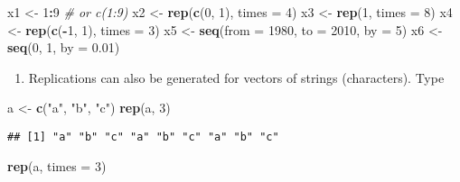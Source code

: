 \documentclass[]{article}
\newenvironment{Shaded}{\begin{snugshade}}{\end{snugshade}}
\newcommand{\KeywordTok}[1]{\textcolor[rgb]{0.13,0.29,0.53}{\textbf{#1}}}
\newcommand{\DataTypeTok}[1]{\textcolor[rgb]{0.13,0.29,0.53}{#1}}
\newcommand{\DecValTok}[1]{\textcolor[rgb]{0.00,0.00,0.81}{#1}}
\newcommand{\FloatTok}[1]{\textcolor[rgb]{0.00,0.00,0.81}{#1}}
\newcommand{\StringTok}[1]{\textcolor[rgb]{0.31,0.60,0.02}{#1}}
\newcommand{\CommentTok}[1]{\textcolor[rgb]{0.56,0.35,0.01}{\textit{#1}}}
\newcommand{\OperatorTok}[1]{\textcolor[rgb]{0.81,0.36,0.00}{\textbf{#1}}}
\newcommand{\NormalTok}[1]{#1}
\providecommand{\tightlist}{%
  \setlength{\itemsep}{0pt}\setlength{\parskip}{0pt}}
\begin{document}
\begin{Shaded}
\begin{Highlighting}[]
\NormalTok{x1 <-}\StringTok{ }\DecValTok{1}\OperatorTok{:}\DecValTok{9}  \CommentTok{# or c(1:9)}
\NormalTok{x2 <-}\StringTok{ }\KeywordTok{rep}\NormalTok{(}\KeywordTok{c}\NormalTok{(}\DecValTok{0}\NormalTok{, }\DecValTok{1}\NormalTok{), }\DataTypeTok{times =} \DecValTok{4}\NormalTok{)}
\NormalTok{x3 <-}\StringTok{ }\KeywordTok{rep}\NormalTok{(}\DecValTok{1}\NormalTok{, }\DataTypeTok{times =} \DecValTok{8}\NormalTok{)}
\NormalTok{x4 <-}\StringTok{ }\KeywordTok{rep}\NormalTok{(}\KeywordTok{c}\NormalTok{(}\OperatorTok{-}\DecValTok{1}\NormalTok{, }\DecValTok{1}\NormalTok{), }\DataTypeTok{times =} \DecValTok{3}\NormalTok{)}
\NormalTok{x5 <-}\StringTok{ }\KeywordTok{seq}\NormalTok{(}\DataTypeTok{from =} \DecValTok{1980}\NormalTok{, }\DataTypeTok{to =} \DecValTok{2010}\NormalTok{, }\DataTypeTok{by =} \DecValTok{5}\NormalTok{)}
\NormalTok{x6 <-}\StringTok{ }\KeywordTok{seq}\NormalTok{(}\DecValTok{0}\NormalTok{, }\DecValTok{1}\NormalTok{, }\DataTypeTok{by =} \FloatTok{0.01}\NormalTok{)}
\end{Highlighting}
\end{Shaded}

\begin{enumerate}
\def\labelenumi{\arabic{enumi}.}
\setcounter{enumi}{1}
\tightlist
\item
  Replications can also be generated for vectors of strings
  (characters). Type
\end{enumerate}

\begin{Shaded}
\begin{Highlighting}[]
\NormalTok{a <-}\StringTok{ }\KeywordTok{c}\NormalTok{(}\StringTok{"a"}\NormalTok{, }\StringTok{"b"}\NormalTok{, }\StringTok{"c"}\NormalTok{)}
\KeywordTok{rep}\NormalTok{(a, }\DecValTok{3}\NormalTok{)}
\end{Highlighting}
\end{Shaded}

\begin{verbatim}
## [1] "a" "b" "c" "a" "b" "c" "a" "b" "c"
\end{verbatim}

\begin{Shaded}
\begin{Highlighting}[]
\KeywordTok{rep}\NormalTok{(a, }\DataTypeTok{times =} \DecValTok{3}\NormalTok{)}
\end{Highlighting}
\end{Shaded}
\end{document}
